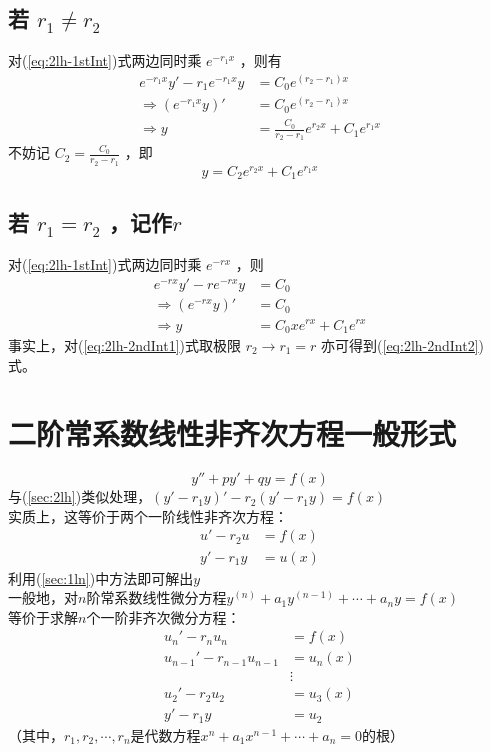 \documentclass[UTF8]{ctexart}
\newcommand\mathe{\mathit{e}}
\begin{document}
	\subsection{若 $r_{1}\neq r_{2}$ } 
		对(\ref{eq:2lh-1stInt})式两边同时乘 $\mathe^{-r_{1}x}$ ，则有
		\begin{align}
			\mathe^{-r_{1}x}y'-r_{1}\mathe^{-r_{1}x}y&=C_{0}\mathe^{(r_{2}-r_{1})x} \\
			\Rightarrow (\mathe^{-r_{1}x}y)'&=C_{0}\mathe^{(r_{2}-r_{1})x} \\
			\Rightarrow y&=\frac{C_{0}}{r_{2}-r_{1}}\mathe^{r_{2}x}+C_{1}\mathe^{r_{1}x} \label{eq:2lh-2ndInt1}
		\end{align}
		不妨记 $C_{2}=\frac{C_{0}}{r_{2}-r_{1}}$ ，即
		\begin{equation}
			y=C_{2}\mathe^{r_{2}x}+C_{1}\mathe^{r_{1}x} \label{eq:2lh-result1}
		\end{equation}
	\subsection{若 $r_{1}=r_{2}$ ，记作$r$}
		对(\ref{eq:2lh-1stInt})式两边同时乘 $\mathe^{-rx}$ ，则
		\begin{align}
			  \mathe^{-rx}y'-r\mathe^{-rx}y&=C_{0} \\
			\Rightarrow (\mathe^{-rx}y)'&=C_{0} \\
			\Rightarrow y&=C_{0}x\mathe^{rx}+C_{1}\mathe^{rx} \label{eq:2lh-2ndInt2}
		\end{align}
		事实上，对(\ref{eq:2lh-2ndInt1})式取极限 $r_{2}\rightarrow r_{1}=r$ 亦可得到(\ref{eq:2lh-2ndInt2})式。
	
\section{二阶常系数线性非齐次方程一般形式} \label{sec:2ln}
	\begin{equation}
		y''+py'+qy=f(x)
	\end{equation}
	与(\ref{sec:2lh})类似处理，$(y'-r_{1}y)'-r_{2}(y'-r_{1}y)=f(x)$ \\
	实质上，这等价于两个一阶线性非齐次方程：
	\begin{align*}
		u'-r_{2}u&=f(x) \\
		y'-r_{1}y&=u(x)
	\end{align*}
	利用(\ref{sec:1ln})中方法即可解出$y$ \\
	一般地，对$n$阶常系数线性微分方程$y^{(n)}+a_{1}y^{(n-1)}+\cdots +a_{n}y=f(x)$ \\
	等价于求解$n$个一阶非齐次微分方程：
	\begin{align*}
		u_{n}'-r_{n}u_{n}&=f(x) \\
		u_{n-1}'-r_{n-1}u_{n-1}&=u_{n}(x) \\
		&\vdots \\
		u_{2}'-r_{2}u_{2}&=u_{3}(x) \\
		y'-r_{1}y&=u_{2}
	\end{align*}
	（其中，$r_{1},r_{2},\cdots ,r_{n}$是代数方程$x^{n}+a_{1}x^{n-1}+\cdots +a_{n}=0$的根）
\end{document}
